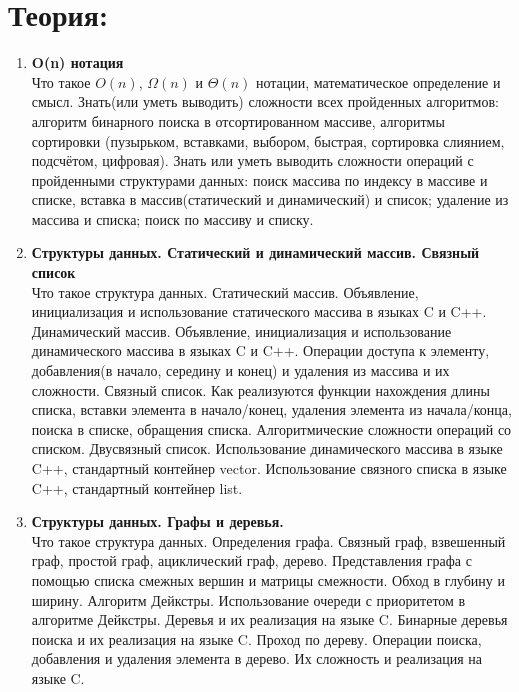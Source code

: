 \documentclass{article}
\begin{document}

\section*{Теория:}
\begin{enumerate}

\item  \textbf{O(n) нотация}\\
Что такое $O(n)$, $\Omega(n)$ и $\Theta(n)$ нотации, математическое определение и смысл.
Знать(или уметь выводить) сложности всех пройденных алгоритмов: алгоритм бинарного поиска в отсортированном массиве, алгоритмы сортировки (пузырьком, вставками, выбором, быстрая, сортировка слиянием, подсчётом, цифровая). Знать или уметь выводить сложности операций с пройденными структурами данных: поиск массива по индексу в массиве и списке, вставка в массив(статический и динамический) и список; удаление из массива и списка; поиск по массиву и списку.

\item \textbf{Структуры данных. Статический и динамический массив. Связный список}\\
Что такое структура данных.
Статический массив. Объявление, инициализация и использование статического массива в языках C и C++. Динамический массив. Объявление, инициализация и использование динамического массива в языках C и C++. Операции доступа к элементу, добавления(в начало, середину и конец) и удаления из массива и их сложности. Связный список. Как реализуются функции нахождения длины списка, вставки элемента в начало/конец, удаления элемента из начала/конца, поиска в списке, обращения списка. Алгоритмические сложности операций со списком. Двусвязный список. Использование динамического массива в языке C++, стандартный контейнер vector. Использование связного списка в языке C++, стандартный контейнер list. 

\item \textbf{Структуры данных. Графы и деревья.}\\
Что такое структура данных.
Определения графа. Связный граф, взвешенный граф, простой граф, ациклический граф, дерево. Представления графа с помощью списка смежных вершин и матрицы смежности. Обход в глубину и ширину. Алгоритм Дейкстры. Использование очереди с приоритетом в алгоритме Дейкстры. Деревья и их реализация на языке C. Бинарные деревья поиска и их реализация на языке C. Проход по дереву. Операции поиска, добавления и удаления элемента в дерево. Их сложность и реализация на языке C.


\end{enumerate}
\end{document}
